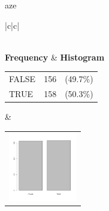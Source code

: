  aze 
  \begin{center}
    \addtolength{\leftskip}{-4cm}\addtolength{\rightskip}{-4cm}
    \begin{tabular}{|c|c|}

      \hline
        \\
      \hline
        {\bf Frequency} & {\bf Histogram}  \\
          \begin{tabular}{@{}l@{ : }cl@{}}
            FALSE & 156 &(49.7\%) \\
            TRUE & 158 &(50.3\%) \\
          \end{tabular}
      &
          \begin{tabular}{@{}l@{}}
            \includegraphics[width=3cm]{graphUniv/V6-barplot}
          \end{tabular}
      \\ \hline 

    \end{tabular}
  \end{center}
  
  



